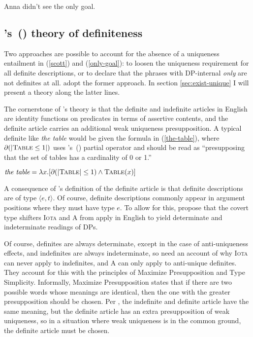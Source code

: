 \documentclass{article}
\newcommand{\citegen}[1]{\citeauthor{#1}'s~(\citeyear{#1})}
\begin{document}
\begin{exe}
	\ex \label{see-only-goal} Anna didn't see the only goal.
\end{exe}

\subsection{\citegen{cb2015} theory of definiteness}
Two approaches are possible to account for the absence of a uniqueness entailment in (\ref{scott}) and (\ref{only-goal}): to loosen the uniqueness requirement for all definite descriptions, or to declare that the phrases with DP-internal \textit{only} are not definites at all. \citeauthor{cb2015} adopt the former approach. In section \ref{sec:exist-unique} I will present a theory along the latter lines.

The cornerstone of \citeauthor{cb2015}'s theory is that the definite and indefinite articles in English are identity functions on predicates in terms of assertive contents, and the definite article carries an additional weak uniqueness presupposition. A typical definite like \textit{the table} would be given the formula in (\ref{the-table}), where $\partial(|\textsc{Table} \le 1|)$ uses \citegen{beaver92} partial operator and should be read as ``presupposing that the set of tables has a cardinality of 0 or 1.''

\begin{exe}
	\ex \label{the-table} $\textit{the table} = \lambda x . [ \partial(|\textsc{Table}| \le 1) \land \textsc{Table}(x) ]$
\end{exe}

A consequence of \citeauthor{cb2015}'s definition of the definite article is that definite descriptions are of type $\langle e, t \rangle$. Of course, definite descriptions commonly appear in argument positions where they must have type $e$. To allow for this, \citeauthor{cb2015} propose that the covert type shifters \textsc{Iota} and \textsc{A} from \citet{partee86} apply in English to yield determinate and indeterminate readings of DPs.

Of course, definites are always determinate, except in the case of anti-uniqueness effects, and indefinites are always indeterminate, so \citeauthor{cb2015} need an account of why \textsc{Iota} can never apply to indefinites, and \textsc{A} can only apply to anti-unique definites. They account for this with the principles of Maximize Presupposition and Type Simplicity. Informally, Maximize Presupposition states that if there are two possible words whose meanings are identical, then the one with the greater presupposition should be chosen. Per \citeauthor{cb2015}, the indefinite and definite article have the same meaning, but the definite article has an extra presupposition of weak uniqueness, so in a situation where weak uniqueness is in the common ground, the definite article must be chosen.
\end{document}
